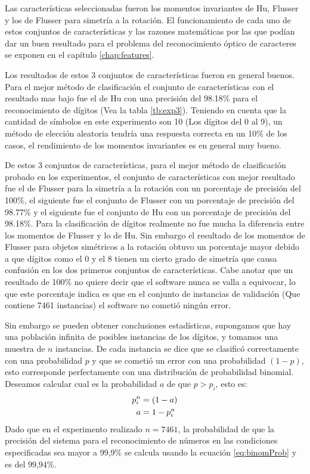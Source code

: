 \documentclass[a4paper, 11pt, oneside]{report}
\begin{document}
Las características seleccionadas fueron los momentos invariantes de Hu, Flusser y los de Flusser para simetría a la rotación. El funcionamiento de cada uno de estos conjuntos de características y las razones matemáticas por las que podían dar un buen resultado para el problema del reconocimiento óptico de caracteres se exponen en el capítulo \ref{chap:features}.

Los resultados de estos 3 conjuntos de características fueron en general buenos. Para el mejor método de clasificación el conjunto de características con el resultado mas bajo fue el de Hu con una precisión del 98.18\% para el reconocimiento de dígitos (Vea la tabla \ref{tb:exp3}). Teniendo en cuenta que la cantidad de símbolos en este experimento son 10 (Los dígitos del 0 al 9), un método de elección aleatoria tendría una respuesta correcta en un 10\% de los casos, el rendimiento de los momentos invariantes es en general muy bueno.

De estos 3 conjuntos de características, para el mejor método de clasificación probado en los experimentos, el conjunto de características con mejor resultado fue el de Flusser para la simetría a la rotación con un porcentaje de precisión del 100\%, el siguiente fue el conjunto de Flusser con un porcentaje de precisión del 98.77\% y el siguiente fue el conjunto de Hu con un porcentaje de precisión del 98.18\%. Para la clasificación de dígitos realmente no fue mucha la diferencia entre los momentos de Flusser y lo de Hu. Sin embargo el resultado de los momentos de Flusser para objetos simétricos a la rotación obtuvo un porcentaje mayor debido a que dígitos como el 0 y el 8 tienen un cierto grado de simetría que causa confusión en los dos primeros conjuntos de características. Cabe anotar que un resultado de 100\% no quiere decir que el software nunca se valla a equivocar, lo que este porcentaje indica es que en el conjunto de instancias de validación (Que contiene 7461 instancias) el software no cometió ningún error. 

Sin embargo se pueden obtener conclusiones estadísticas, supongamos que hay una población infinita de posibles instancias de los dígitos, y tomamos una muestra de $n$ instancias. De cada instancia se dice que se clasificó correctamente con una probabilidad $p$ y que se cometió un error con una probabilidad $(1-p)$, esto corresponde perfectamente con una distribución de probabilidad binomial. Deseamos calcular cual es la probabilidad $a$ de que $p>p_i$, esto es:
\begin{align}
	p_i^n &= (1-a) \notag \\
	a &= 1-p_i^n \label{eq:binomProb}
\end{align}
Dado que en el experimento realizado $n=7461$, la probabilidad de que la precisión del sistema para el reconocimiento de números en las condiciones especificadas sea mayor a 99,9\% se calcula usando la ecuación \ref{eq:binomProb} y es del 99,94\%.
\end{document}

